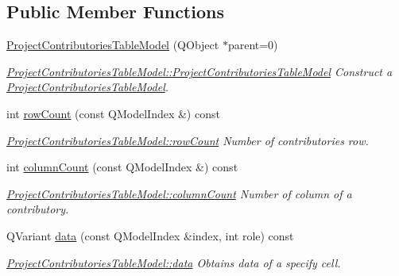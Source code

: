 \subsection*{Public Member Functions}
\begin{DoxyCompactItemize}
\item 
\hyperlink{classGui_1_1Widgets_1_1WdgModels_1_1ProjectContributoriesTableModel_abb9a482809fb18cf5bbc94d3de608e80}{Project\-Contributories\-Table\-Model} (Q\-Object $\ast$parent=0)
\begin{DoxyCompactList}\small\item\em \hyperlink{classGui_1_1Widgets_1_1WdgModels_1_1ProjectContributoriesTableModel_abb9a482809fb18cf5bbc94d3de608e80}{Project\-Contributories\-Table\-Model\-::\-Project\-Contributories\-Table\-Model} Construct a \hyperlink{classGui_1_1Widgets_1_1WdgModels_1_1ProjectContributoriesTableModel}{Project\-Contributories\-Table\-Model}. \end{DoxyCompactList}\item 
int \hyperlink{classGui_1_1Widgets_1_1WdgModels_1_1ProjectContributoriesTableModel_a89017ec04ab8bb1669f05a1dc45a6496}{row\-Count} (const Q\-Model\-Index \&) const 
\begin{DoxyCompactList}\small\item\em \hyperlink{classGui_1_1Widgets_1_1WdgModels_1_1ProjectContributoriesTableModel_a89017ec04ab8bb1669f05a1dc45a6496}{Project\-Contributories\-Table\-Model\-::row\-Count} Number of contributories row. \end{DoxyCompactList}\item 
int \hyperlink{classGui_1_1Widgets_1_1WdgModels_1_1ProjectContributoriesTableModel_a9c4e040dd182d0f3d7a0a3835ca0de2e}{column\-Count} (const Q\-Model\-Index \&) const 
\begin{DoxyCompactList}\small\item\em \hyperlink{classGui_1_1Widgets_1_1WdgModels_1_1ProjectContributoriesTableModel_a9c4e040dd182d0f3d7a0a3835ca0de2e}{Project\-Contributories\-Table\-Model\-::column\-Count} Number of column of a contributory. \end{DoxyCompactList}\item 
Q\-Variant \hyperlink{classGui_1_1Widgets_1_1WdgModels_1_1ProjectContributoriesTableModel_a4848c1f82ecaa85f49f410539a8d5a56}{data} (const Q\-Model\-Index \&index, int role) const 
\begin{DoxyCompactList}\small\item\em \hyperlink{classGui_1_1Widgets_1_1WdgModels_1_1ProjectContributoriesTableModel_a4848c1f82ecaa85f49f410539a8d5a56}{Project\-Contributories\-Table\-Model\-::data} Obtains data of a specify cell. \end{DoxyCompactList}\item 

\end{DoxyCompactItemize}
